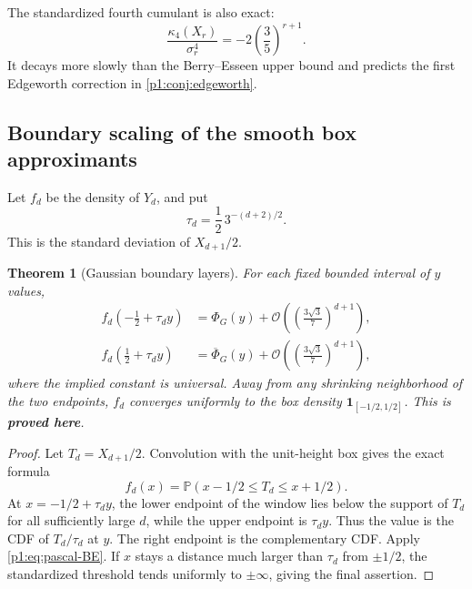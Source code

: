 \documentclass[11pt,oneside]{article}
\numberwithin{equation}{section}
\newtheorem{theorem}{Theorem}[section]
\theoremstyle{definition}
\theoremstyle{remark}
\newcommand{\Prob}{\mathbb P}
\newcommand{\bigO}{\mathcal O}
\newcommand{\statusproved}{\textcolor{deepgreen}{\textbf{proved here}}}
\newcommand{\NormalCDF}{\Phi_{\!G}}
\newcommand{\NormalSurv}{\overline{\Phi}_{\!G}}
\begin{document}
\begin{remark}
The standardized fourth cumulant is also exact:
\begin{equation}
 \frac{\kappa_4(X_r)}{\sigma_r^4}
 =-2\left(\frac35\right)^{r+1}.
 \label{p1:eq:pascal-standardized-k4}
\end{equation}
It decays more slowly than the Berry--Esseen upper bound and predicts the first Edgeworth
correction in \cref{p1:conj:edgeworth}.
\end{remark}

\subsection{Boundary scaling of the smooth box approximants}

Let $f_d$ be the density of $Y_d$, and put
\begin{equation}
 \tau_d=\frac12\,3^{-(d+2)/2}.
 \label{p1:eq:tau-d}
\end{equation}
This is the standard deviation of $X_{d+1}/2$.

\begin{theorem}[Gaussian boundary layers]
\label{p1:thm:boundary-layer}
For each fixed bounded interval of $y$ values,
\begin{align}
 f_d\!\left(-\frac12+\tau_dy\right)
 &=\NormalCDF(y)+
   \bigO\!\left(\left(\frac{3\sqrt3}{7}\right)^{d+1}\right),
 \label{p1:eq:left-boundary}\\
 f_d\!\left(\frac12+\tau_dy\right)
 &=\NormalSurv(y)+
   \bigO\!\left(\left(\frac{3\sqrt3}{7}\right)^{d+1}\right),
 \label{p1:eq:right-boundary}
\end{align}
where the implied constant is universal.  Away from any shrinking neighborhood of the two
endpoints, $f_d$ converges uniformly to the box density
$\mathbf1_{[-1/2,1/2]}$.  This is \statusproved.
\end{theorem}

\begin{proof}
Let $T_d=X_{d+1}/2$.  Convolution with the unit-height box gives the exact formula
\begin{equation}
 f_d(x)=\Prob(x-1/2\le T_d\le x+1/2).
 \label{p1:eq:fd-window}
\end{equation}
At $x=-1/2+\tau_dy$, the lower endpoint of the window lies below the support of $T_d$ for
all sufficiently large $d$, while the upper endpoint is $\tau_dy$.  Thus the value is the
CDF of $T_d/\tau_d$ at $y$.  The right endpoint is the complementary CDF.  Apply
\eqref{p1:eq:pascal-BE}.  If $x$ stays a distance much larger than $\tau_d$ from
$\pm1/2$, the standardized threshold tends uniformly to $\pm\infty$, giving the final
assertion.
\end{proof}
\end{document}
